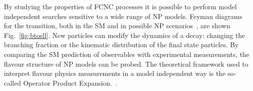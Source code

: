 By studying the properties of FCNC processes it is possible to perform model independent searches sensitive to a wide range of NP models. Feyman diagrams for the \btosll transition, both in the SM and in possible NP scenarios~\cite{bstoll-higgs,bstoll-zprime}, are shown Fig.~\ref{fig:btosll}. New particles can modify the dynamics of a decay: changing the branching fraction or the kinematic distribution of the final state particles. By comparing the SM prediction of observables with experimental measurements, the flavour structure of NP models can be probed. The theoretical framework used to interpret flavour physics measurements in a model independent way is the so-called Operator Product Expansion.~\cite{ope}.

\begin{figure}[!tb]
\centering
\begin{subfigure}{0.49\textwidth}
\caption{}
\label{fig:btosll:a}
\end{subfigure}
\begin{subfigure}{0.49\textwidth}
\begin{tikzpicture}

\end{tikzpicture}
\end{subfigure}
\end{figure}

